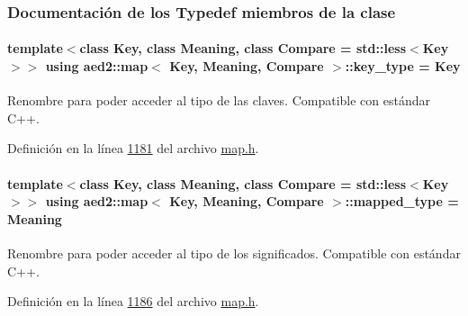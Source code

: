 \subsubsection{Documentación de los \textquotesingle{}Typedef\textquotesingle{} miembros de la clase}
\paragraph[{\texorpdfstring{key\+\_\+type}{key_type}}]{\setlength{\rightskip}{0pt plus 5cm}template$<$class Key, class Meaning, class Compare = std\+::less$<$\+Key$>$$>$ using {\bf aed2\+::map}$<$ Key, Meaning, Compare $>$\+::{\bf key\+\_\+type} =  Key}\hypertarget{classaed2_1_1map_a4273e8812e7105a618df58a2c8b72b7d_a4273e8812e7105a618df58a2c8b72b7d}{}\label{classaed2_1_1map_a4273e8812e7105a618df58a2c8b72b7d_a4273e8812e7105a618df58a2c8b72b7d}


Renombre para poder acceder al tipo de las claves. Compatible con estándar C++. 



Definición en la línea \hyperlink{map_8h_source_l01181}{1181} del archivo \hyperlink{map_8h_source}{map.\+h}.

\paragraph[{\texorpdfstring{mapped\+\_\+type}{mapped_type}}]{\setlength{\rightskip}{0pt plus 5cm}template$<$class Key, class Meaning, class Compare = std\+::less$<$\+Key$>$$>$ using {\bf aed2\+::map}$<$ Key, Meaning, Compare $>$\+::{\bf mapped\+\_\+type} =  Meaning}\hypertarget{classaed2_1_1map_aa3e34bf624f3009884a71b18f4ddae40_aa3e34bf624f3009884a71b18f4ddae40}{}\label{classaed2_1_1map_aa3e34bf624f3009884a71b18f4ddae40_aa3e34bf624f3009884a71b18f4ddae40}


Renombre para poder acceder al tipo de los significados. Compatible con estándar C++. 



Definición en la línea \hyperlink{map_8h_source_l01186}{1186} del archivo \hyperlink{map_8h_source}{map.\+h}.

